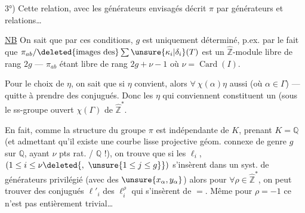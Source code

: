 3°) Cette relation, avec les générateurs envisagés décrit \(\pi\)
 par générateurs et relations\ldots

\uline{NB} On sait que par ces conditions, \(g\) est uniquement déterminé,
p.ex. par le fait que
\(\pi_{ab}/\deleted{\text{images des}}\sum\unsure{\kappa_i|\delta_i}(T)\)
est un \(\widehat{\mathbb Z}\)-module libre de rang \(2g\) --- \(\pi_{ab}\)
étant libre de rang \(2g+\nu-1\) où \(\nu=\operatorname{Card}(I)\).

Pour le choix de \(\eta\), on sait que si \(\eta\) convient, alors
\(\forall\ \chi(\alpha)\eta\) aussi (où \(\alpha\in\Gamma\)) --- quitte à prendre
des conjugués. Donc les \(\eta\) qui conviennent  constituent
un  (sous le ss-groupe ouvert
\(\chi(\Gamma)\) de \(\widehat{\mathbb Z}^{*}\).




En fait, comme la structure du groupe \(\pi\) est indépendante de \(K\),
prenant \(K=\mathbb Q\) (et admettant qu'il existe une courbe lisse projective
géom. connexe de genre \(g\) sur \(\mathbb Q\), ayant \(\nu\) pts rat. / \(\mathbb Q\) !),
on trouve que si les \(\ell_i\), 
\((1\leq i\leq\nu\deleted{,\ \unsure{1\leq j\leq g}})\)
 s'insèrent dans un syst. de générateurs
privilégié (avec des \(\unsure{x_\alpha,y_\alpha}\)) alors pour
\(\forall\rho\in\widehat{\mathbb Z}^{*}\), on peut trouver des conjugués
\(\ell'_i\) des \(\ell_i^\rho\) qui s'insèrent de \(=\).
Même pour \(\rho=-1\) ce n'est pas entièrement trivial\ldots

